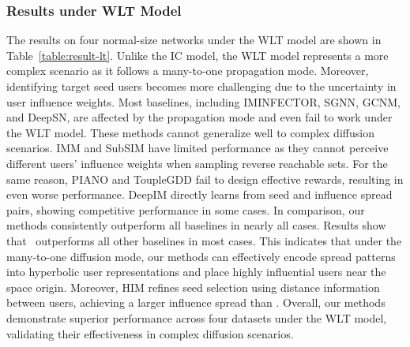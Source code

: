 \subsubsection{Results under WLT Model}
The results on four normal-size networks under the WLT model are shown in Table~\ref{table:result-lt}.
Unlike the IC model, the WLT model represents a more complex scenario as it follows a many-to-one propagation mode.
Moreover, identifying target seed users becomes more challenging due to the uncertainty in user influence weights.
Most baselines, including IMINFECTOR, SGNN, GCNM, and DeepSN, are affected by the propagation mode and even fail to work under the WLT model.
These methods cannot generalize well to complex diffusion scenarios.
IMM and SubSIM have limited performance as they cannot perceive different users' influence weights when sampling reverse reachable sets.
For the same reason, PIANO and ToupleGDD fail to design effective rewards, resulting in even worse performance.
DeepIM directly learns from seed and influence spread pairs, showing competitive performance in some cases.
In comparison, our methods consistently outperform all baselines in nearly all cases.
Results show that \HIMMD~outperforms all other baselines in most cases.
This indicates that under the many-to-one diffusion mode, our methods can effectively encode spread patterns into hyperbolic user representations and place highly influential users near the space origin.
Moreover, HIM refines seed selection using distance information between users, achieving a larger influence spread than \HIMMD. 
Overall, our methods demonstrate superior performance across four datasets under the WLT model, validating their effectiveness in complex diffusion scenarios.
